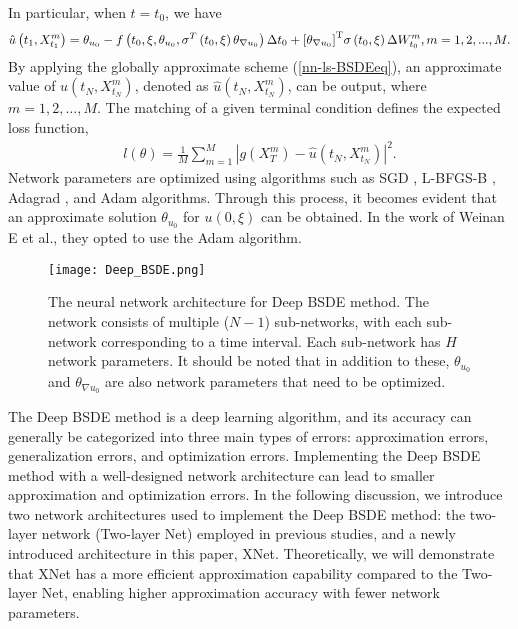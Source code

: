 \documentclass[11pt]{article}
\begin{document}
In particular, when $t=t_0$, we have
\begin{equation}\label{t0-nn-ls-BSDEeq}
	\begin{aligned}
		\hat u\left( {{t_1},X_{{t_1}}^m} \right) = {\theta _{{u_0}}} - f\left( {{t_0},\xi ,{\theta _{{u_0}}},{\sigma ^T}\left( {{t_0},\xi } \right){\theta _{\nabla {u_0}}}} \right)\Delta {t_0} + {\left[ {{\theta _{\nabla {u_0}}}} \right]^{\rm{T}}}\sigma \left( {{t_0},\xi } \right)\Delta W_{{t_0}}^m,m = 1,2,...,M.
	\end{aligned}
\end{equation}
By applying the globally approximate scheme (\ref{nn-ls-BSDEeq}), an approximate value of $u\left(t_N, X_{t_N}^m\right)$, denoted as $\hat{u}\left(t_N, X_{t_N}^m\right)$, can be output, where $m=1,2, \ldots, M$. The matching of a given terminal condition defines the expected loss function,
\begin{equation}\label{BSDE-LOSS}
	\begin{aligned}
		l(\theta ) = \frac{1}{M}\sum\limits_{m = 1}^M {{{\left| {g\left( {{X_T^m}} \right) - \hat u\left( {{t_N},X_{{t_N}}^m} \right)} \right|}^2}} .
	\end{aligned}
\end{equation}
Network parameters are optimized using algorithms such as SGD \textsuperscript{\cite{SGD}}, L-BFGS-B \textsuperscript{\cite{LBFGSB1,LBFGSB2}}, Adagrad \textsuperscript{\cite{ADAGRAD}}, and Adam \textsuperscript{\cite{ADAM}} algorithms. 
Through this process, it becomes evident that an approximate solution
${\theta _{{u_0}}}$ for $u(0, \xi)$ can be obtained. 
In the work of Weinan E et al., they opted to use the Adam algorithm.

\begin{figure*}[!hbtp]
	\begin{center}
		\texttt{[image: Deep\_BSDE.png]}		
	\end{center}
	\vspace{-0.7cm}
	\caption{The neural network architecture for Deep BSDE method. The network consists of multiple ($N-1$) sub-networks, with each sub-network corresponding to a time interval. Each sub-network has $H$ network parameters. It should be noted that in addition to these, ${\theta _{{u_0}}}$ and ${\theta _{\nabla {u_0}}}$ are also network parameters that need to be optimized.}
	\label{fig0}
\end{figure*}

The Deep BSDE method is a deep learning algorithm, and its accuracy can generally be categorized into three main types of errors: approximation errors, generalization errors, and optimization errors. Implementing the Deep BSDE method with a well-designed network architecture can lead to smaller approximation and optimization errors.
In the following discussion, we introduce two network architectures used to implement the Deep BSDE method: the two-layer network (Two-layer Net) employed in previous studies, and a newly introduced architecture in this paper, XNet. Theoretically, we will demonstrate that XNet has a more efficient approximation capability compared to the Two-layer Net, enabling higher approximation accuracy with fewer network parameters.
%
\end{document}
